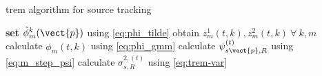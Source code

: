 \begin{algorithm}[H]\label{alg:trem}
\caption{\acrshort{trem} algorithm for source tracking}
\begin{algorithmic}
\State \textbf{set} $\tilde\phi^k_m(\vect{p})$ using \eqref{eq:phi_tilde}
\State obtain $z_m^1(t,k), z_m^2(t,k)\ \forall\ k,m$
\State calculate $\phi_m(t,k)$ using \eqref{eq:phi_gmm}
\State calculate $\psi^{(t)}_{s\vect{p},R}$ using \eqref{eq:m_step_psi}
\State calculate $\sigma^{2,(t)}_{s,R}$ using \eqref{eq:trem-var}
\EndFor
\end{algorithmic}
\end{algorithm}
